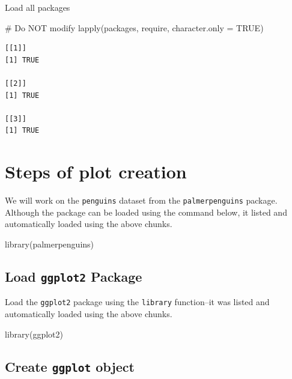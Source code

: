 \documentclass[
  letterpaper,
  DIV=11,
  numbers=noendperiod]{scrreprt}
\newenvironment{Shaded}{\begin{snugshade}}{\end{snugshade}}
\newcommand{\AttributeTok}[1]{\textcolor[rgb]{0.40,0.45,0.13}{#1}}
\newcommand{\CommentTok}[1]{\textcolor[rgb]{0.37,0.37,0.37}{#1}}
\newcommand{\ConstantTok}[1]{\textcolor[rgb]{0.56,0.35,0.01}{#1}}
\newcommand{\FunctionTok}[1]{\textcolor[rgb]{0.28,0.35,0.67}{#1}}
\newcommand{\NormalTok}[1]{\textcolor[rgb]{0.00,0.23,0.31}{#1}}
\begin{document}
Load all packages

\begin{Shaded}
\begin{Highlighting}[]
\CommentTok{\# Do NOT modify}
\FunctionTok{lapply}\NormalTok{(packages, require, }\AttributeTok{character.only =} \ConstantTok{TRUE}\NormalTok{)}
\end{Highlighting}
\end{Shaded}

\begin{verbatim}
[[1]]
[1] TRUE

[[2]]
[1] TRUE

[[3]]
[1] TRUE
\end{verbatim}

\section{Steps of plot creation}\label{steps-of-plot-creation}

We will work on the \texttt{penguins} dataset from the
\texttt{palmerpenguins} package. Although the package can be loaded
using the command below, it listed and automatically loaded using the
above chunks.

\begin{Shaded}
\begin{Highlighting}[]
\FunctionTok{library}\NormalTok{(palmerpenguins)}
\end{Highlighting}
\end{Shaded}

\subsection{\texorpdfstring{Load \texttt{ggplot2}
Package}{Load ggplot2 Package}}\label{load-ggplot2-package}

Load the \texttt{ggplot2} package using the \texttt{library}
function--it was listed and automatically loaded using the above chunks.

\begin{Shaded}
\begin{Highlighting}[]
\FunctionTok{library}\NormalTok{(ggplot2)}
\end{Highlighting}
\end{Shaded}

\subsection{\texorpdfstring{Create \texttt{ggplot}
object}{Create ggplot object}}\label{create-ggplot-object}
\end{document}
